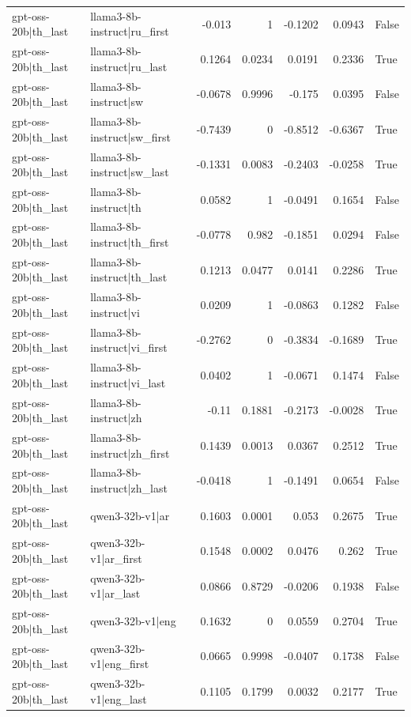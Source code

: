 \begin{table}
\begin{tabular}{l l r r r r l}
gpt-oss-20b|th_last & llama3-8b-instruct|ru_first & -0.013 & 1 & -0.1202 & 0.0943 & False \\
gpt-oss-20b|th_last & llama3-8b-instruct|ru_last & 0.1264 & 0.0234 & 0.0191 & 0.2336 & True \\
gpt-oss-20b|th_last & llama3-8b-instruct|sw & -0.0678 & 0.9996 & -0.175 & 0.0395 & False \\
gpt-oss-20b|th_last & llama3-8b-instruct|sw_first & -0.7439 & 0 & -0.8512 & -0.6367 & True \\
gpt-oss-20b|th_last & llama3-8b-instruct|sw_last & -0.1331 & 0.0083 & -0.2403 & -0.0258 & True \\
gpt-oss-20b|th_last & llama3-8b-instruct|th & 0.0582 & 1 & -0.0491 & 0.1654 & False \\
gpt-oss-20b|th_last & llama3-8b-instruct|th_first & -0.0778 & 0.982 & -0.1851 & 0.0294 & False \\
gpt-oss-20b|th_last & llama3-8b-instruct|th_last & 0.1213 & 0.0477 & 0.0141 & 0.2286 & True \\
gpt-oss-20b|th_last & llama3-8b-instruct|vi & 0.0209 & 1 & -0.0863 & 0.1282 & False \\
gpt-oss-20b|th_last & llama3-8b-instruct|vi_first & -0.2762 & 0 & -0.3834 & -0.1689 & True \\
gpt-oss-20b|th_last & llama3-8b-instruct|vi_last & 0.0402 & 1 & -0.0671 & 0.1474 & False \\
gpt-oss-20b|th_last & llama3-8b-instruct|zh & -0.11 & 0.1881 & -0.2173 & -0.0028 & True \\
gpt-oss-20b|th_last & llama3-8b-instruct|zh_first & 0.1439 & 0.0013 & 0.0367 & 0.2512 & True \\
gpt-oss-20b|th_last & llama3-8b-instruct|zh_last & -0.0418 & 1 & -0.1491 & 0.0654 & False \\
gpt-oss-20b|th_last & qwen3-32b-v1|ar & 0.1603 & 0.0001 & 0.053 & 0.2675 & True \\
gpt-oss-20b|th_last & qwen3-32b-v1|ar_first & 0.1548 & 0.0002 & 0.0476 & 0.262 & True \\
gpt-oss-20b|th_last & qwen3-32b-v1|ar_last & 0.0866 & 0.8729 & -0.0206 & 0.1938 & False \\
gpt-oss-20b|th_last & qwen3-32b-v1|eng & 0.1632 & 0 & 0.0559 & 0.2704 & True \\
gpt-oss-20b|th_last & qwen3-32b-v1|eng_first & 0.0665 & 0.9998 & -0.0407 & 0.1738 & False \\
gpt-oss-20b|th_last & qwen3-32b-v1|eng_last & 0.1105 & 0.1799 & 0.0032 & 0.2177 & True \\

\end{tabular}
\end{table}
